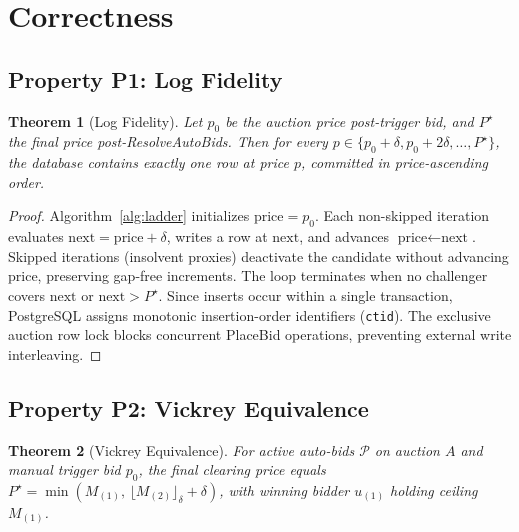\documentclass[conference]{IEEEtran}
\newtheorem{theorem}{Theorem}
\begin{document}
\section{Correctness}

\subsection{Property P1: Log Fidelity}
\begin{theorem}[Log Fidelity]
Let $p_0$ be the auction price post-trigger bid, and $P^\star$ the final price post-ResolveAutoBids.
Then for every $p \in \{p_0 + \delta, p_0 + 2\delta, \ldots, P^\star\}$, the database contains
exactly one row at price $p$, committed in price-ascending order.
\end{theorem}

\begin{proof}
Algorithm~\ref{alg:ladder} initializes $\text{price} = p_0$. Each non-skipped iteration
evaluates $\text{next} = \text{price} + \delta$, writes a row at $\text{next}$, and advances
$\text{price} \leftarrow \text{next}$. Skipped iterations (insolvent proxies) deactivate the
candidate without advancing $\text{price}$, preserving gap-free increments.
The loop terminates when no challenger covers $\text{next}$ or $\text{next} > P^\star$.
Since inserts occur within a single transaction, PostgreSQL assigns monotonic insertion-order
identifiers (\texttt{ctid}). The exclusive auction row lock blocks concurrent PlaceBid
operations, preventing external write interleaving.
\end{proof}

\subsection{Property P2: Vickrey Equivalence}
\begin{theorem}[Vickrey Equivalence]
For active auto-bids $\mathcal{P}$ on auction $A$ and manual trigger bid $p_0$, the final
clearing price equals $P^\star = \min(M_{(1)},\, \lfloor M_{(2)} \rfloor_\delta + \delta)$,
with winning bidder $u_{(1)}$ holding ceiling $M_{(1)}$.
\end{theorem}
\end{document}
